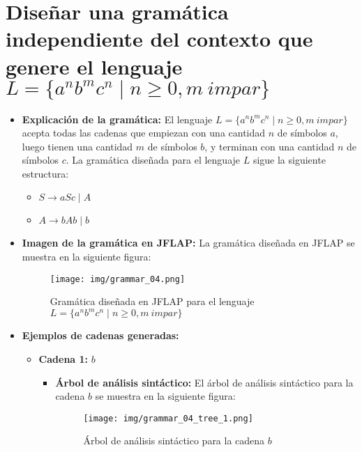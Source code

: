 \documentclass[11pt]{report}
\begin{document}
\section{Diseñar una gramática independiente del contexto que genere el lenguaje $L = \{a^n b^m c^n \mid n \geq 0, m \ impar\}$}
\begin{itemize}
  \item \textbf{Explicación de la gramática:} El lenguaje $L = \{a^n b^m c^n \mid n \geq 0, m \ impar\}$ acepta todas las cadenas que empiezan con una cantidad $n$ de símbolos $a$, luego tienen una cantidad $m$ de símbolos $b$, y terminan con una cantidad 
  $n$ de símbolos $c$. La gramática diseñada para el lenguaje $L$ sigue la siguiente estructura:
  \begin{itemize}
    \item $S \rightarrow aSc \mid A$
    \item $A \rightarrow bAb \mid b$
  \end{itemize}
  \item \textbf{Imagen de la gramática en JFLAP:} La gramática diseñada en JFLAP se muestra en la siguiente figura:
  \begin{figure}[H]
    \centering
    \texttt{[image: img/grammar\_04.png]}
    \caption{Gramática diseñada en JFLAP para el lenguaje $L = \{a^n b^m c^n \mid n \geq 0, m \ impar\}$}
  \end{figure}
  \item \textbf{Ejemplos de cadenas generadas:}
  \begin{itemize}
    \item \textbf{Cadena 1:} $b$
    \begin{itemize}
      \item \textbf{Árbol de análisis sintáctico:} El árbol de análisis sintáctico para la cadena $b$ se muestra en la siguiente figura:
      \begin{figure}[H]
        \centering
        \texttt{[image: img/grammar\_04\_tree\_1.png]}
        \caption{Árbol de análisis sintáctico para la cadena $b$}
        \label{fig:arbol10}
      \end{figure}
    \end{itemize}

    \newpage


\end{itemize}
\end{itemize}
\end{document}
